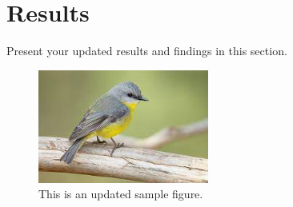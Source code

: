 \section{Results}
Present your updated results and findings in this section.

\begin{figure}[h]
    \centering
    \includegraphics[width=0.5\textwidth]{image.jpeg}
    \caption{This is an updated sample figure.}
    \label{fig:sample}
\end{figure}
